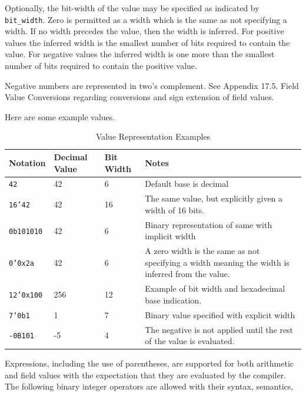 \documentclass[12pt]{article}
\begin{document}
Optionally, the bit-width of the value may be specified as indicated
by \texttt{bit_width}.  Zero is permitted as a width which is the
same as not specifying a width.  If no width precedes the value, then
the width is inferred. For positive values the inferred width is the
smallest number of bits required to contain the value. For negative
values the inferred width is one more than the smallest number of bits
required to contain the positive value.

Negative numbers are represented in two's complement. See Appendix 17.5.
Field Value Conversions regarding conversions and sign extension of field
values.

Here are some example values.

\begin{table}[H]
\begin{center}
\begin{tabular}{| l | l | l | p{} |} \hline
\textbf{Notation} &
\textbf{Decimal Value} &
\textbf{Bit Width} &
\textbf{Notes} \\ \hline
\texttt{42} &
42 &
6 &
Default base is decimal \\ \hline
\texttt{16'42} &
42 &
16 &
The same value, but explicitly given a width of 16 bits. \\ \hline
\texttt{0b101010} &
42 &
6 &
Binary representation of same with implicit width \\ \hline
\texttt{0'0x2a} &
42 &
6 &
A zero width is the same as not specifying a width meaning the width is inferred from the value.   \\ \hline
\texttt{12'0x100} &
256 &
12 &
Example of bit width and hexadecimal base indication. \\ \hline
\texttt{7'0b1} &
1 &
7 &
Binary value specified with explicit width \\ \hline
\texttt{-0B101} &
-5 &
4 &
The negative is not applied until the rest of the value is evaluated. \\ \hline
\end{tabular}
\end{center}
\caption{Value Representation Examples}
\end{table}

\vspace{3mm}
Expressions, including the use of parentheses, are supported for both
arithmetic and field values with the expectation that they are
evaluated by the compiler.  The following binary integer operators are
allowed with their syntax, semantics,
\end{document}
